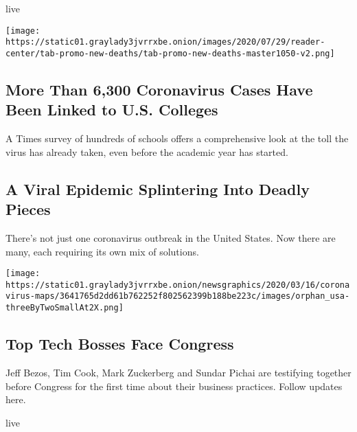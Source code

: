 live

\texttt{[image: https://static01.graylady3jvrrxbe.onion/images/2020/07/29/reader-center/tab-promo-new-deaths/tab-promo-new-deaths-master1050-v2.png]}

\href{/interactive/2020/07/28/us/covid-19-colleges-universities.html}{}

\hypertarget{more-than-6300-coronavirus-cases-have-been-linked-to-us-colleges}{%
\subsection{More Than 6,300 Coronavirus Cases Have Been Linked to U.S.
Colleges}\label{more-than-6300-coronavirus-cases-have-been-linked-to-us-colleges}}

A Times survey of hundreds of schools offers a comprehensive look at the
toll the virus has already taken, even before the academic year has
started.

\href{/2020/07/29/health/coronavirus-future-america.html}{}

\hypertarget{a-viral-epidemic-splintering-into-deadly-pieces}{%
\subsection{A Viral Epidemic Splintering Into Deadly
Pieces}\label{a-viral-epidemic-splintering-into-deadly-pieces}}

There's not just one coronavirus outbreak in the United States. Now
there are many, each requiring its own mix of solutions.

\texttt{[image: https://static01.graylady3jvrrxbe.onion/newsgraphics/2020/03/16/coronavirus-maps/3641765d2dd61b762252f802562399b188be223c/images/orphan\_usa-threeByTwoSmallAt2X.png]}

\href{https://www.nytimes3xbfgragh.onion/live/2020/07/29/technology/tech-ceos-hearing-testimony}{}

\hypertarget{top-tech-bosses-face-congress}{%
\subsection{Top Tech Bosses Face
Congress}\label{top-tech-bosses-face-congress}}

Jeff Bezos, Tim Cook, Mark Zuckerberg and Sundar Pichai are testifying
together before Congress for the first time about their business
practices. Follow updates here.

live

\href{/2020/07/27/business/jeff-bezos-amazon-congress.html}{}

